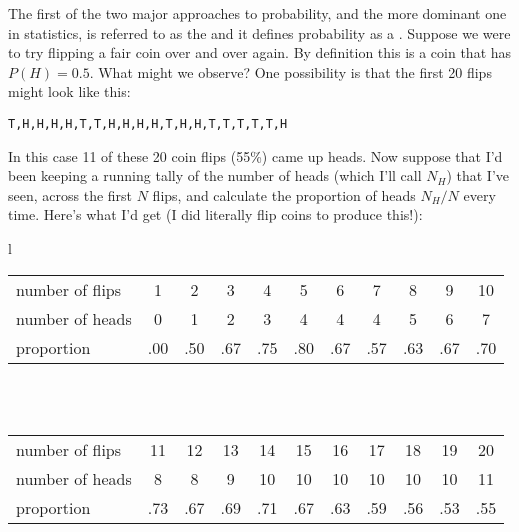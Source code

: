 The first of the two major approaches to probability, and the more dominant one in statistics, is referred to as the  and it defines probability as a . Suppose we were to try flipping a fair coin over and over again. By definition this is a coin that has $P(H) = 0.5$. What might we observe? One possibility is that the first 20 flips might look like this:
\begin{verbatim}
T,H,H,H,H,T,T,H,H,H,H,T,H,H,T,T,T,T,T,H
\end{verbatim}
In this case 11 of these 20 coin flips (55\%) came up heads. Now suppose that I'd been keeping a running tally of the number of heads (which I'll call $N_H$) that I've seen, across the first $N$ flips, and calculate the proportion of heads $N_H / N$ every time. Here's what I'd get (I did literally flip coins to produce this!):
\begin{center}
\begin{tabular}{l}
\begin{tabular}{l|cccccccccc}
number of flips &1 & 2 & 3 & 4 & 5 & 6 & 7 & 8 & 9 & 10 \\
number of heads & 0 & 1 & 2 & 3 & 4 & 4 & 4 & 5 & 6 & 7  \\ \hline
proportion    & .00 & .50 & .67 & .75 & .80 & .67 & .57 & .63 & .67 & .70 \\
\end{tabular} \\ \vspace*{12pt}
\\
\begin{tabular}{l|cccccccccc}
number of flips & 11 & 12 & 13 & 14 & 15 & 16 & 17 & 18 & 19 & 20 \\
number of heads & 8  &  8 &  9 & 10 & 10 & 10 & 10 & 10 & 10 & 11 \\ \hline
proportion & .73 & .67 & .69 & .71 & .67 &  .63 & .59 & .56 & .53 & .55\\
\end{tabular}
\end{tabular}
\end{center}

